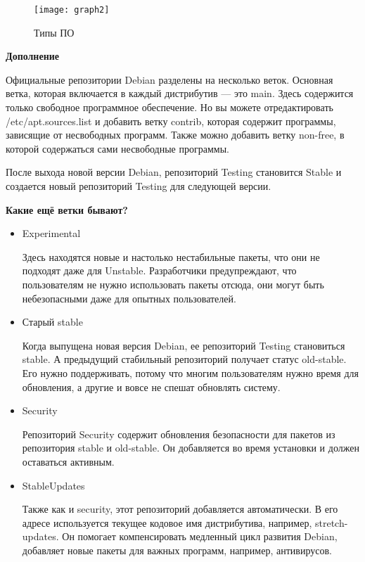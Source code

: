 \documentclass[oneside, final, 14pt]{extreport} %
\begin{document}
\begin{figure}[ht]
    \centering
    \texttt{[image: graph2]} %
    \caption{Типы ПО}
    \label{fig:graph2}
\end{figure}

\vspace{\baselineskip}

\textbf{Дополнение}

Официальные репозитории Debian разделены на несколько веток. Основная ветка, 
которая включается в каждый дистрибутив --- это main. Здесь содержится только 
свободное программное обеспечение. Но вы можете отредактировать /etc/apt.sources.list и 
добавить ветку contrib, которая содержит программы, зависящие от несвободных 
программ. Также можно добавить ветку non-free, в которой содержаться сами несвободные программы.

После выхода новой версии Debian, репозиторий Testing становится Stable и создается новый репозиторий Testing для следующей версии.

\textbf{Какие ещё ветки бывают?}

\begin{itemize}
    \item Experimental 
    
    Здесь находятся новые и настолько нестабильные пакеты, что они не подходят даже для Unstable. Разработчики предупреждают, что пользователям не нужно использовать пакеты отсюда, они могут быть небезопасными даже для опытных пользователей.

    \item Старый stable
    
    Когда выпущена новая версия Debian, ее репозиторий Testing становиться stable. А предыдущий стабильный репозиторий получает статус old-stable. Его нужно поддерживать, потому что многим пользователям нужно время для обновления, а другие и вовсе не спешат обновлять систему.

    \item Security
    
    Репозиторий Security содержит обновления безопасности для пакетов из репозитория stable и old-stable. Он добавляется во время установки и должен оставаться активным.

    \item StableUpdates
    
    Также как и security, этот репозиторий добавляется автоматически. В его адресе используется текущее кодовое имя дистрибутива, например, stretch-updates. Он помогает компенсировать медленный цикл развития Debian, добавляет новые пакеты для важных программ, например, антивирусов.
\end{itemize}
\end{document}
